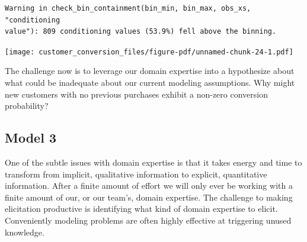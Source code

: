 \documentclass[
  letterpaper,
  DIV=11,
  numbers=noendperiod]{scrartcl}
\newenvironment{Shaded}{\begin{snugshade}}{\end{snugshade}}
\newcommand{\AttributeTok}[1]{\textcolor[rgb]{0.40,0.45,0.13}{#1}}
\newcommand{\ControlFlowTok}[1]{\textcolor[rgb]{0.00,0.23,0.31}{#1}}
\newcommand{\DecValTok}[1]{\textcolor[rgb]{0.68,0.00,0.00}{#1}}
\newcommand{\FunctionTok}[1]{\textcolor[rgb]{0.28,0.35,0.67}{#1}}
\newcommand{\NormalTok}[1]{\textcolor[rgb]{0.00,0.23,0.31}{#1}}
\newcommand{\OtherTok}[1]{\textcolor[rgb]{0.00,0.23,0.31}{#1}}
\newcommand{\SpecialCharTok}[1]{\textcolor[rgb]{0.37,0.37,0.37}{#1}}
\newcommand{\StringTok}[1]{\textcolor[rgb]{0.13,0.47,0.30}{#1}}
\begin{document}
\begin{Shaded}
\end{Shaded}

\begin{verbatim}
Warning in check_bin_containment(bin_min, bin_max, obs_xs, "conditioning
value"): 809 conditioning values (53.9%) fell above the binning.
\end{verbatim}

\texttt{[image: customer\_conversion\_files/figure-pdf/unnamed-chunk-24-1.pdf]}

The challenge now is to leverage our domain expertise into a hypothesize
about what could be inadequate about our current modeling assumptions.
Why might new customers with no previous purchases exhibit a non-zero
conversion probability?

\subsection{Model 3}\label{model-3}

One of the subtle issues with domain expertise is that it takes energy
and time to transform from implicit, qualitative information to
explicit, quantitative information. After a finite amount of effort we
will only ever be working with a finite amount of our, or our team's,
domain expertise. The challenge to making elicitation productive is
identifying what kind of domain expertise to elicit. Conveniently
modeling problems are often highly effective at triggering unused
knowledge.
\end{document}
